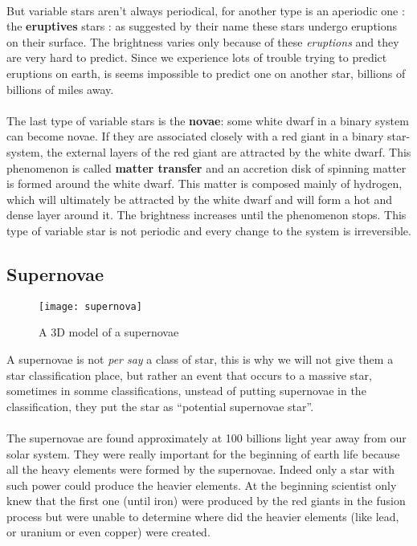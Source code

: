 \documentclass[a4paper, 11pt]{article} %
\begin{document}
\paragraph*{} 
But variable stars aren't always periodical, for another type is an aperiodic one : the \textbf{eruptives} stars : as suggested by their name these stars undergo eruptions on their surface. The brightness varies only because of these \textit{eruptions} and they are very hard to predict. Since we experience lots of trouble trying to predict eruptions on earth, is seems impossible to predict one on another star, billions of billions of miles away.

\paragraph*{}
The last type of variable stars is the \textbf{novae}: some white dwarf in a binary system can become novae. If they are associated closely with a red giant in a binary star-system, the external layers of the red giant are attracted by the white dwarf. This phenomenon is called \textbf{matter transfer} and an accretion disk of spinning matter is formed around the white dwarf. This matter is composed mainly of hydrogen, which will ultimately be attracted by the white dwarf and will form a hot and dense layer around it. The brightness increases until the phenomenon stops. This type of variable star is not periodic and every change to the system is irreversible. 


\subsection{Supernovae}

\begin{figure}[h]
\centering
\texttt{[image: supernova]}
\caption{A 3D model of a supernovae}
\end{figure}

A supernovae is not \textit{per say} a class of star, this is why we will not give them a star classification place, but rather an event that occurs to a massive star, sometimes in somme classifications, unstead of putting supernovae in the classification, they put the star as ``potential supernovae star''.

\paragraph*{}

The supernovae are found approximately at 100 billions light year away from our solar system. They were really important for the beginning of earth life because all the heavy elements were formed by the supernovae. Indeed only a star with such power could produce the heavier elements. At the beginning scientist only knew that the first one (until iron) were produced by the red giants in the fusion process but were unable to determine where did the heavier elements (like lead, or uranium or even copper) were created.
\end{document}
